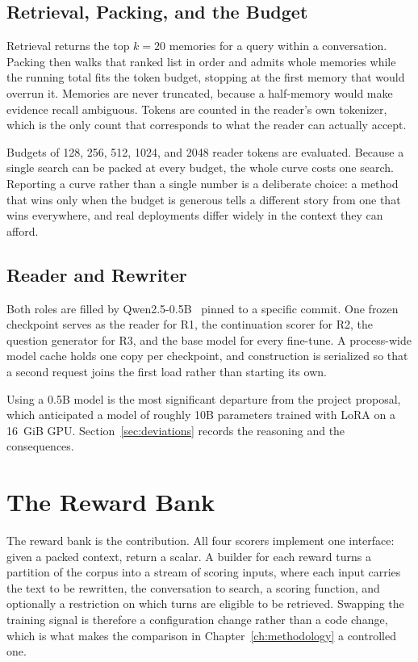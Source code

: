 \documentclass[12pt,letterpaper,oneside]{report}
\newcommand{\Ra}{R1}
\newcommand{\Rb}{R2}
\newcommand{\Rc}{R3}
\begin{document}
\subsection{Retrieval, Packing, and the Budget}

Retrieval returns the top $k=20$ memories for a query within a conversation.
Packing then walks that ranked list in order and admits whole memories while
the running total fits the token budget, stopping at the first memory that
would overrun it. Memories are never truncated, because a half-memory would
make evidence recall ambiguous. Tokens are counted in the reader's own
tokenizer, which is the only count that corresponds to what the reader can
actually accept.

Budgets of 128, 256, 512, 1024, and 2048 reader tokens are evaluated. Because a
single search can be packed at every budget, the whole curve costs one search.
Reporting a curve rather than a single number is a deliberate choice: a method
that wins only when the budget is generous tells a different story from one
that wins everywhere, and real deployments differ widely in the context they
can afford.

\subsection{Reader and Rewriter}

Both roles are filled by Qwen2.5-0.5B~\cite{qwen} pinned to a specific commit.
One frozen checkpoint serves as the reader for \Ra, the continuation scorer for
\Rb, the question generator for \Rc, and the base model for every fine-tune. A
process-wide model cache holds one copy per checkpoint, and construction is
serialized so that a second request joins the first load rather than starting
its own.

Using a 0.5B model is the most significant departure from the project proposal,
which anticipated a model of roughly 10B parameters trained with LoRA on a
16~GiB GPU. Section~\ref{sec:deviations} records the reasoning and the
consequences.

\section{The Reward Bank}
\label{sec:rewards}

The reward bank is the contribution. All four scorers implement one interface:
given a packed context, return a scalar. A builder for each reward turns a
partition of the corpus into a stream of scoring inputs, where each input
carries the text to be rewritten, the conversation to search, a scoring
function, and optionally a restriction on which turns are eligible to be
retrieved. Swapping the training signal is therefore a configuration change
rather than a code change, which is what makes the comparison in
Chapter~\ref{ch:methodology} a controlled one.
\end{document}

